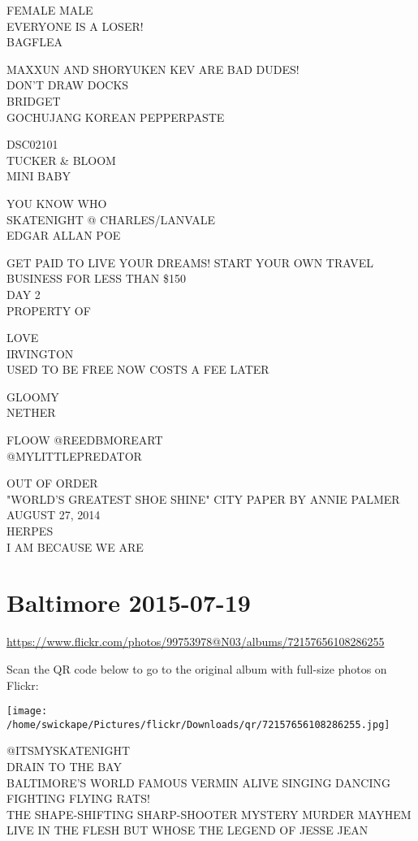 \documentclass[10pt,letterpaper]{article}
\begin{document}
FEMALE MALE\\
EVERYONE IS A LOSER!\\
BAGFLEA

MAXXUN AND SHORYUKEN KEV ARE BAD DUDES!\\
DON'T DRAW DOCKS\\
BRIDGET\\
GOCHUJANG KOREAN PEPPERPASTE

DSC02101\\
TUCKER \& BLOOM\\
MINI BABY

YOU KNOW WHO\\
SKATENIGHT @ CHARLES/LANVALE\\
EDGAR ALLAN POE

GET PAID TO LIVE YOUR DREAMS!  START YOUR OWN TRAVEL BUSINESS FOR LESS THAN \$150\\
DAY 2\\
PROPERTY OF

LOVE\\
IRVINGTON\\
USED TO BE FREE NOW COSTS A FEE LATER

GLOOMY\\
NETHER

FLOOW @REEDBMOREART\\
@MYLITTLEPREDATOR

OUT OF ORDER\\
"WORLD'S GREATEST SHOE SHINE" CITY PAPER BY ANNIE PALMER AUGUST 27, 2014\\
HERPES\\
I AM BECAUSE WE ARE
\pagebreak

\section*{Baltimore 2015-07-19}

\url{https://www.flickr.com/photos/99753978@N03/albums/72157656108286255}

Scan the QR code below to go to the original album with full-size photos on Flickr:

\texttt{[image: /home/swickape/Pictures/flickr/Downloads/qr/72157656108286255.jpg]}
\pagebreak

@ITSMYSKATENIGHT\\
DRAIN TO THE BAY\\
BALTIMORE'S WORLD FAMOUS VERMIN ALIVE SINGING DANCING FIGHTING FLYING RATS!\\
THE SHAPE{-}SHIFTING SHARP{-}SHOOTER MYSTERY MURDER MAYHEM LIVE IN THE FLESH BUT WHOSE THE LEGEND OF JESSE JEAN
\end{document}
